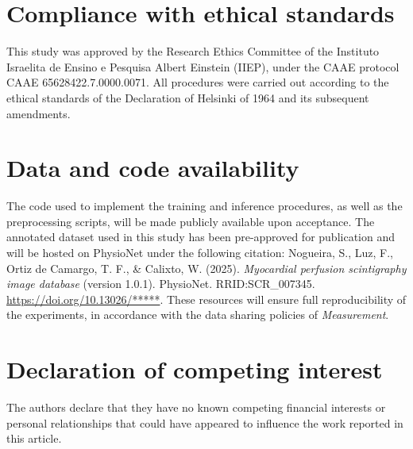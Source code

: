 \documentclass[times,final]{elsarticle}
\begin{document}
\section*{Compliance with ethical standards}
This study was approved by the Research Ethics Committee of the Instituto Israelita de Ensino e Pesquisa Albert Einstein (IIEP), under the CAAE protocol CAAE 65628422.7.0000.0071. All procedures were carried out according to the ethical standards of the Declaration of Helsinki of 1964 and its subsequent amendments.
\section*{Data and code availability}
The code used to implement the training and inference procedures, as well as the preprocessing scripts, will be made publicly available upon acceptance. The annotated dataset used in this study has been pre-approved for publication and will be hosted on PhysioNet under the following citation:
Nogueira, S., Luz, F., Ortiz de Camargo, T. F., \& Calixto, W. (2025). \textit{Myocardial perfusion scintigraphy image database} (version 1.0.1). PhysioNet. RRID:SCR\_007345. \url{https://doi.org/10.13026/*****}.
These resources will ensure full reproducibility of the experiments, in accordance with the data sharing policies of \textit{Measurement}.
\section*{Declaration of competing interest}
The authors declare that they have no known competing financial interests or personal relationships that could have appeared to influence the work reported in this article.
\end{document}

